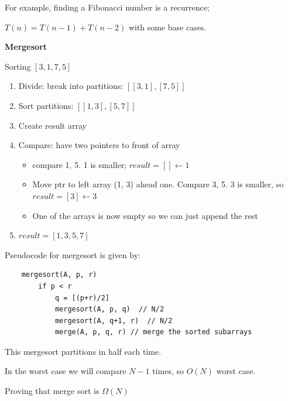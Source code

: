 \documentclass[../notes.tex]{subfiles}
\begin{document}
For example, finding a Fibonacci number is a recurrence;

$ T(n) = T(n-1) + T(n-2) $ with some base cases.



\begin{example}
	\textbf{Mergesort} 

	Sorting $ [3,1,7,5] $ 

	\begin{enumerate}
		\item Divide: break into partitions: $ [[3, 1], [7, 5]] $ 
		\item Sort partitions: $[[1, 3], [5, 7]] $ 
		\item Create result array
		\item Compare: have two pointers to front of array
			\begin{itemize}
				\item compare 1, 5. 1 is smaller; $ result = [] \leftarrow 1 $ 
				\item Move ptr to left array (1, 3) ahead one. Compare 3, 5. 3 is smaller, so $ result = [3] \leftarrow 3 $ 
				\item One of the arrays is now empty so we can just append the rest
			\end{itemize}
		\item $ result = [1, 3, 5, 7] $ 
	\end{enumerate}
\end{example}


\begin{definition}
	Pseudocode for mergesort is given by:

	\begin{listing}[H]
	\begin{verbatim}
	mergesort(A, p, r)
		if p < r
			q = [(p+r)/2]
			mergesort(A, p, q)  // N/2
			mergesort(A, q+1, r)  // N/2
			merge(A, p, q, r) // merge the sorted subarrays
	\end{verbatim}
	\end{listing}

	This mergesort partitions in half each time.

	In the worst case we will compare $ N-1 $ times, so $ O(N) $ worst case.

	Proving that merge sort is $ \Omega(N) $ 
	
\end{definition}
\end{document}
